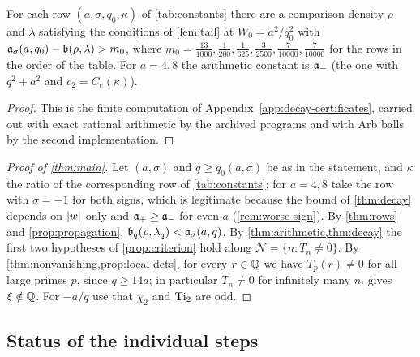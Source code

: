 \begin{theorem}\label{thm:rows}
For each row $(a,\sigma,q_0,\kappa)$ of \cref{tab:constants} there are a comparison density $\rho$
and $\lambda$ satisfying the conditions of \cref{lem:tail} at $W_0=a^2/q_0^2$ with
$\mathfrak{a}_\sigma(a,q_0)-\mathfrak{b}(\rho,\lambda)>m_0$, where $m_0=\frac{13}{1000},\frac1{200},
\frac1{625},\frac3{2500},\frac7{10000},\frac7{10000}$ for the rows in the order of the table. For
$a=4,8$ the arithmetic constant is $\mathfrak{a}_-$ (the one with $q^2+a^2$ and $c_2=C_e(\kappa)$).
\end{theorem}

\begin{proof}
This is the finite computation of Appendix~\ref{app:decay-certificates}, carried out with exact
rational arithmetic by the archived programs and with Arb balls by the second implementation.
\end{proof}

\begin{proof}[Proof of \cref{thm:main}]
Let $(a,\sigma)$ and $q\ge q_0(a,\sigma)$ be as in the statement, and $\kappa$ the ratio of the
corresponding row of \cref{tab:constants}; for $a=4,8$ take the row with $\sigma=-1$ for both signs,
which is legitimate because the bound of \cref{thm:decay} depends on $\left\lvert w\right\rvert$ only and
$\mathfrak{a}_+\ge\mathfrak{a}_-$ for even $a$ (\cref{rem:worse-sign}). By \cref{thm:rows} and
\cref{prop:propagation}, $\mathfrak{b}_q(\rho,\lambda_q)<\mathfrak{a}_\sigma(a,q)$. By \cref{thm:arithmetic,thm:decay}
the first two hypotheses of \cref{prop:criterion} hold along $\mathcal N=\{n:T_n\ne0\}$. By
\cref{thm:nonvanishing,prop:local-dets}, for every $r\in\mathbb{Q}$ we have $T_p(r)\ne0$ for all large
primes $p$, since $q\ge14a$; in particular $T_n\ne0$ for infinitely many $n$. 
gives $\xi\notin\mathbb{Q}$. For $-a/q$ use that $\chi_2$ and $\operatorname{Ti}_2$ are odd.
\end{proof}

\subsection{Status of the individual steps}\label{subsec:step-status}

